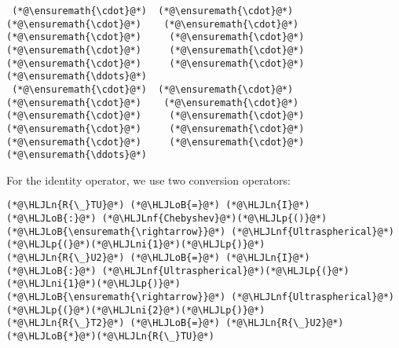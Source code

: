 \documentclass[12pt,a4paper]{article}
\newcommand{\HLJLn}[1]{#1}
\newcommand{\HLJLnf}[1]{\textcolor[RGB]{66,102,213}{#1}}
\newcommand{\HLJLni}[1]{\textcolor[RGB]{59,151,46}{#1}}
\newcommand{\HLJLoB}[1]{\textcolor[RGB]{102,102,102}{\textbf{#1}}}
\newcommand{\HLJLp}[1]{#1}
\begin{document}
\begin{lstlisting}
 (*@\ensuremath{\cdot}@*)  (*@\ensuremath{\cdot}@*)   (*@\ensuremath{\cdot}@*)    (*@\ensuremath{\cdot}@*)    (*@\ensuremath{\cdot}@*)     (*@\ensuremath{\cdot}@*)     (*@\ensuremath{\cdot}@*)     (*@\ensuremath{\cdot}@*)     (*@\ensuremath{\cdot}@*)     (*@\ensuremath{\cdot}@*)   (*@\ensuremath{\ddots}@*)
 (*@\ensuremath{\cdot}@*)  (*@\ensuremath{\cdot}@*)   (*@\ensuremath{\cdot}@*)    (*@\ensuremath{\cdot}@*)    (*@\ensuremath{\cdot}@*)     (*@\ensuremath{\cdot}@*)     (*@\ensuremath{\cdot}@*)     (*@\ensuremath{\cdot}@*)     (*@\ensuremath{\cdot}@*)     (*@\ensuremath{\cdot}@*)   (*@\ensuremath{\ddots}@*)
\end{lstlisting}


For the identity operator, we use two conversion operators:


\begin{lstlisting}
(*@\HLJLn{R{\_}TU}@*) (*@\HLJLoB{=}@*) (*@\HLJLn{I}@*) (*@\HLJLoB{:}@*) (*@\HLJLnf{Chebyshev}@*)(*@\HLJLp{()}@*) (*@\HLJLoB{\ensuremath{\rightarrow}}@*) (*@\HLJLnf{Ultraspherical}@*)(*@\HLJLp{(}@*)(*@\HLJLni{1}@*)(*@\HLJLp{)}@*)
(*@\HLJLn{R{\_}U2}@*) (*@\HLJLoB{=}@*) (*@\HLJLn{I}@*) (*@\HLJLoB{:}@*) (*@\HLJLnf{Ultraspherical}@*)(*@\HLJLp{(}@*)(*@\HLJLni{1}@*)(*@\HLJLp{)}@*) (*@\HLJLoB{\ensuremath{\rightarrow}}@*) (*@\HLJLnf{Ultraspherical}@*)(*@\HLJLp{(}@*)(*@\HLJLni{2}@*)(*@\HLJLp{)}@*)
(*@\HLJLn{R{\_}T2}@*) (*@\HLJLoB{=}@*) (*@\HLJLn{R{\_}U2}@*)(*@\HLJLoB{*}@*)(*@\HLJLn{R{\_}TU}@*)
\end{lstlisting}
\end{document}
